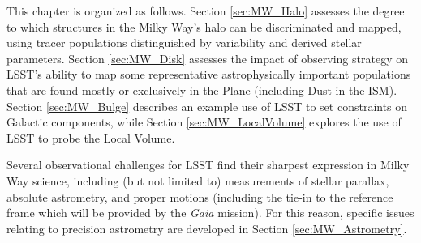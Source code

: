 This chapter is organized as follows. Section \ref{sec:MW_Halo}
assesses the degree to which structures in the Milky Way's halo can be
discriminated and mapped, using tracer populations distinguished by
variability and derived stellar parameters. Section \ref{sec:MW_Disk}
assesses the impact of observing strategy on LSST's ability to map
some representative astrophysically important populations that are
found mostly or exclusively in the Plane (including Dust in the
ISM).  Section \ref{sec:MW_Bulge}
describes an example use of LSST to set constraints on Galactic
components, while Section \ref{sec:MW_LocalVolume} explores the use of
LSST to probe the Local Volume.

Several observational challenges for LSST find their sharpest
expression in Milky Way science, including (but not limited to)
measurements of stellar parallax, absolute astrometry, and proper
motions (including the tie-in to the reference frame which will be
provided by the {\it Gaia} mission). For this reason, specific issues
relating to precision astrometry are developed in Section
\ref{sec:MW_Astrometry}.








%
%
%
%
%
%
